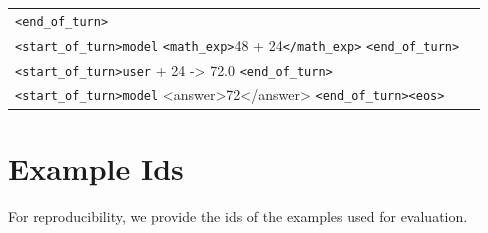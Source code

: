 \documentclass{article} %
\begin{document}
\begin{table}[h!]
\begin{tabular}{|p{5cm}|p{8cm}|}
        \texttt{\textless end\_of\_turn\textgreater} \\
        \texttt{\textless start\_of\_turn\textgreater model} \newline
        \texttt{\textless math\_exp\textgreater}48 + 24\texttt{\textless /math\_exp\textgreater} \newline
        \texttt{\textless end\_of\_turn\textgreater} \\
        \texttt{\textless start\_of\_turn\textgreater user} \newline
        48 + 24 -> 72.0
        \texttt{\textless end\_of\_turn\textgreater} \\
        \texttt{\textless start\_of\_turn\textgreater model} \newline
        <answer>72</answer>
        \texttt{\textless end\_of\_turn\textgreater}\texttt{\textless eos\textgreater} \\
    \end{tabular}
\end{table}

\clearpage
\section{Example Ids}\label{sec:example-ids}

For reproducibility, we provide the ids of the examples used for evaluation.
\end{document}
